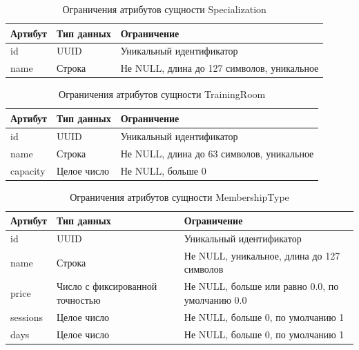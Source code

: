 \begin{table}[H]
	\centering
	\begin{tabular}{|p{3.5cm}|p{3.5cm}|p{8.5cm}|}
		\hline
		\textbf{Артибут}             & \textbf{Тип данных}   & \textbf{Ограничение}             \\ \hline
		id                            & UUID                 & Уникальный идентификатор         \\ \hline
		name                          & Строка                 & Не NULL, длина до 127 символов, уникальное   \\ \hline
	\end{tabular}
	\caption{Ограничения атрибутов сущности Specialization}
\end{table}

\begin{table}[H]
	\centering
	\begin{tabular}{|p{3.5cm}|p{3.5cm}|p{8.5cm}|}
		\hline
		\textbf{Артибут}             & \textbf{Тип данных}   & \textbf{Ограничение}             \\ \hline
		id                            & UUID                  & Уникальный идентификатор         \\ \hline
		name                          & Строка                 & Не NULL, длина до 63 символов, уникальное                         \\ \hline
		capacity                      & Целое число              & Не NULL, больше 0                \\ \hline
	\end{tabular}
	\caption{Ограничения атрибутов сущности TrainingRoom}
\end{table}

\begin{table}[H]
	\centering
	\begin{tabular}{|p{2.5cm}|p{3.5cm}|p{9.5cm}|}
		\hline
		\textbf{Артибут}             & \textbf{Тип данных}   & \textbf{Ограничение}             \\ \hline
		id                            & UUID                 & Уникальный идентификатор         \\ \hline
		name                          & Строка                 & Не NULL, уникальное,  длина до 127 символов   \\ \hline
		price                         & Число с фиксированной точностью               & Не NULL, больше или равно 0.0, по умолчанию 0.0     \\ \hline
		sessions                      & Целое число               & Не NULL, больше 0, по умолчанию 1              \\ \hline
		days                          & Целое число              & Не NULL, больше 0, по умолчанию 1              \\ \hline
	\end{tabular}
	\caption{Ограничения атрибутов сущности MembershipType}
\end{table}

